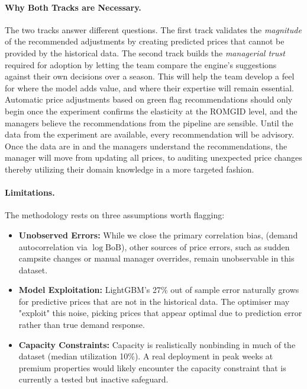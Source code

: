\documentclass[11pt,a4paper]{article}
\begin{document}
\paragraph{Why Both Tracks are Necessary.} The two tracks answer different questions. The first track validates the \emph{magnitude} of the recommended adjustments by creating predicted prices that cannot be provided by the historical data. The second track builds the \emph{managerial trust} required for adoption by letting the team compare the engine's suggestions against their own decisions over a season. This will help the team develop a feel for where the model adds value, and where their expertise will remain essential. Automatic price adjustments based on green flag recommendations should only begin once the experiment confirms the elasticity at the ROMGID level, and the managers believe the recommendations from the pipeline are sensible. Until the data from the experiment are available, every recommendation will be advisory. Once the data are in and the managers understand the recommendations, the manager will move from updating all prices, to auditing unexpected price changes thereby utilizing their domain knowledge in a more targeted fashion.

\paragraph{Limitations.} The methodology rests on three assumptions worth flagging:
\begin{itemize}
    \item \textbf{Unobserved Errors:} While we close the primary correlation bias, (demand autocorrelation via $\log\mathrm{BoB}$), other sources of price errors, such as sudden campsite changes or manual manager overrides, remain unobservable in this dataset.
    \item \textbf{Model Exploitation:} LightGBM's 27\% out of sample error naturally grows for predictive prices that are not in the historical data. The optimiser may "exploit" this noise, picking prices that appear optimal due to prediction error rather than true demand response.
    \item \textbf{Capacity Constraints:} Capacity is realistically nonbinding in much of the dataset (median utilization 10\%). A real deployment in peak weeks at premium properties would likely encounter the capacity constraint that is currently a tested but inactive safeguard.
\end{itemize}
\end{document}
